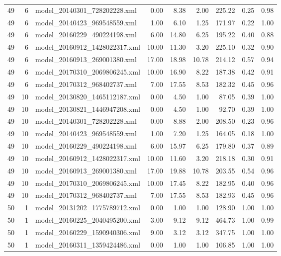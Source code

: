 \begin{table}[ht]
\begin{tabular}{rrlrrrrrr}
   49 &   6 & model\_20140301\_728202228.xml & 0.00 & 8.38 & 2.00 & 225.22 & 0.25 & 0.98 \\ 
   49 &   6 & model\_20140423\_969548559.xml & 1.00 & 6.10 & 1.25 & 171.97 & 0.22 & 1.00 \\ 
   49 &   6 & model\_20160229\_490224198.xml & 6.00 & 14.80 & 6.25 & 195.22 & 0.40 & 0.88 \\ 
   49 &   6 & model\_20160912\_1428022317.xml & 10.00 & 11.30 & 3.20 & 225.10 & 0.32 & 0.90 \\ 
   49 &   6 & model\_20160913\_269001380.xml & 17.00 & 18.98 & 10.78 & 214.12 & 0.57 & 0.94 \\ 
   49 &   6 & model\_20170310\_2069806245.xml & 10.00 & 16.90 & 8.22 & 187.38 & 0.42 & 0.91 \\ 
   49 &   6 & model\_20170312\_968402737.xml & 7.00 & 17.55 & 8.53 & 182.32 & 0.45 & 0.96 \\ 
   49 &  10 & model\_20130820\_1465112187.xml & 0.00 & 4.50 & 1.00 & 87.05 & 0.39 & 1.00 \\ 
   49 &  10 & model\_20130821\_1446947208.xml & 0.00 & 4.50 & 1.00 & 92.70 & 0.39 & 1.00 \\ 
   49 &  10 & model\_20140301\_728202228.xml & 0.00 & 8.88 & 2.00 & 208.50 & 0.23 & 0.96 \\ 
   49 &  10 & model\_20140423\_969548559.xml & 1.00 & 7.20 & 1.25 & 164.05 & 0.18 & 1.00 \\ 
   49 &  10 & model\_20160229\_490224198.xml & 6.00 & 15.97 & 6.25 & 179.80 & 0.37 & 0.89 \\ 
   49 &  10 & model\_20160912\_1428022317.xml & 10.00 & 11.60 & 3.20 & 218.18 & 0.30 & 0.91 \\ 
   49 &  10 & model\_20160913\_269001380.xml & 17.00 & 19.88 & 10.78 & 203.55 & 0.54 & 0.96 \\ 
   49 &  10 & model\_20170310\_2069806245.xml & 10.00 & 17.45 & 8.22 & 182.95 & 0.40 & 0.96 \\ 
   49 &  10 & model\_20170312\_968402737.xml & 7.00 & 17.55 & 8.53 & 182.93 & 0.45 & 0.96 \\ 
   50 &   1 & model\_20131202\_1775789712.xml & 0.00 & 1.00 & 1.00 & 128.90 & 1.00 & 1.00 \\ 
   50 &   1 & model\_20160225\_2040495200.xml & 3.00 & 9.12 & 9.12 & 464.73 & 1.00 & 0.99 \\ 
   50 &   1 & model\_20160229\_1590940306.xml & 9.00 & 3.12 & 3.12 & 347.75 & 1.00 & 1.00 \\ 
   50 &   1 & model\_20160311\_1359424486.xml & 0.00 & 1.00 & 1.00 & 106.85 & 1.00 & 1.00 \\ 

\end{tabular}
\end{table}
